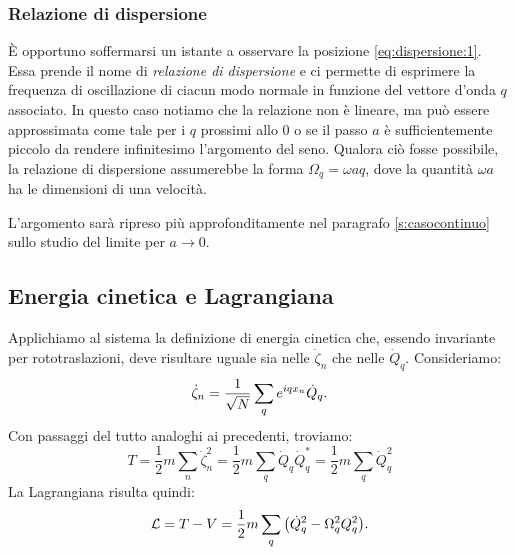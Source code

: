         \subsubsection{Relazione di dispersione}
            \`E opportuno soffermarsi un istante a osservare la posizione \eqref{eq:dispersione:1}. Essa prende il nome di \emph{relazione di dispersione} e ci permette di esprimere la frequenza di oscillazione di ciacun modo normale in funzione del vettore d'onda $q$ associato. In questo caso notiamo che la relazione non \`e lineare, ma pu\`o essere approssimata come tale per i $q$ prossimi allo $0$ o se il passo $a$ \`e sufficientemente piccolo da rendere infinitesimo l'argomento del seno. Qualora ci\`o fosse possibile, la relazione di dispersione assumerebbe la forma $\Omega_q=\omega aq$, dove la quantit\`a $\omega a$ ha le dimensioni di una velocit\`a.
            \par L'argomento sar\`a ripreso pi\`u approfonditamente nel paragrafo \ref{s:casocontinuo} sullo studio del limite per $a\to 0$.
    \subsection{Energia cinetica e Lagrangiana}
        Applichiamo al sistema la definizione di energia cinetica che, essendo invariante per rototraslazioni, deve risultare uguale sia nelle $\dot{\zeta}_n$ che nelle $\dot{Q}_q$. Consideriamo:
            $$\dot{\zeta}_n=\frac{1}{\sqrt{N}}\sum_qe^{iqx_n}\dot{Q}_q.$$
        Con passaggi del tutto analoghi ai precedenti, troviamo:
            $$T=\frac{1}{2}m\sum_n\dot{\zeta}_n^2=\frac{1}{2}m\sum_q\dot{Q}_q\dot{Q}^*_q=\frac{1}{2}m\sum_q\dot{Q}_q^2$$
        La Lagrangiana risulta quindi:
        \begin{equation}
            \mathcal{L}=T-V=\frac{1}{2}m\sum_q\qty(\dot{Q}_q^2-\Omega_q^2Q_q^2).
            \label{eq:mollelagrangiana}
        \end{equation}
